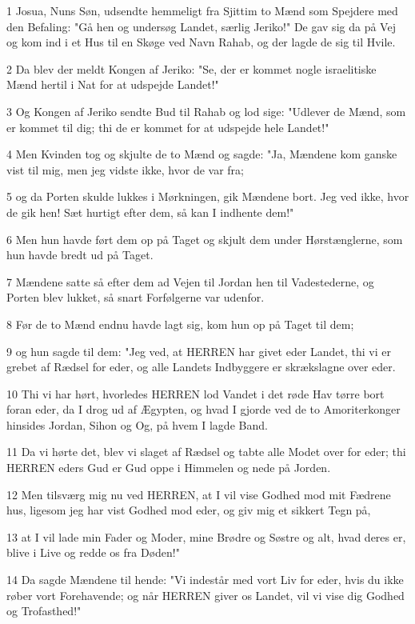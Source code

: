 \par 1 Josua, Nuns Søn, udsendte hemmeligt fra Sjittim to Mænd som Spejdere med den Befaling: "Gå hen og undersøg Landet, særlig Jeriko!" De gav sig da på Vej og kom ind i et Hus til en Skøge ved Navn Rahab, og der lagde de sig til Hvile.
\par 2 Da blev der meldt Kongen af Jeriko: "Se, der er kommet nogle israelitiske Mænd hertil i Nat for at udspejde Landet!"
\par 3 Og Kongen af Jeriko sendte Bud til Rahab og lod sige: "Udlever de Mænd, som er kommet til dig; thi de er kommet for at udspejde hele Landet!"
\par 4 Men Kvinden tog og skjulte de to Mænd og sagde: "Ja, Mændene kom ganske vist til mig, men jeg vidste ikke, hvor de var fra;
\par 5 og da Porten skulde lukkes i Mørkningen, gik Mændene bort. Jeg ved ikke, hvor de gik hen! Sæt hurtigt efter dem, så kan I indhente dem!"
\par 6 Men hun havde ført dem op på Taget og skjult dem under Hørstænglerne, som hun havde bredt ud på Taget.
\par 7 Mændene satte så efter dem ad Vejen til Jordan hen til Vadestederne, og Porten blev lukket, så snart Forfølgerne var udenfor.
\par 8 Før de to Mænd endnu havde lagt sig, kom hun op på Taget til dem;
\par 9 og hun sagde til dem: "Jeg ved, at HERREN har givet eder Landet, thi vi er grebet af Rædsel for eder, og alle Landets Indbyggere er skrækslagne over eder.
\par 10 Thi vi har hørt, hvorledes HERREN lod Vandet i det røde Hav tørre bort foran eder, da I drog ud af Ægypten, og hvad I gjorde ved de to Amoriterkonger hinsides Jordan, Sihon og Og, på hvem I lagde Band.
\par 11 Da vi hørte det, blev vi slaget af Rædsel og tabte alle Modet over for eder; thi HERREN eders Gud er Gud oppe i Himmelen og nede på Jorden.
\par 12 Men tilsværg mig nu ved HERREN, at I vil vise Godhed mod mit Fædrene hus, ligesom jeg har vist Godhed mod eder, og giv mig et sikkert Tegn på,
\par 13 at I vil lade min Fader og Moder, mine Brødre og Søstre og alt, hvad deres er, blive i Live og redde os fra Døden!"
\par 14 Da sagde Mændene til hende: "Vi indestår med vort Liv for eder, hvis du ikke røber vort Forehavende; og når HERREN giver os Landet, vil vi vise dig Godhed og Trofasthed!"
